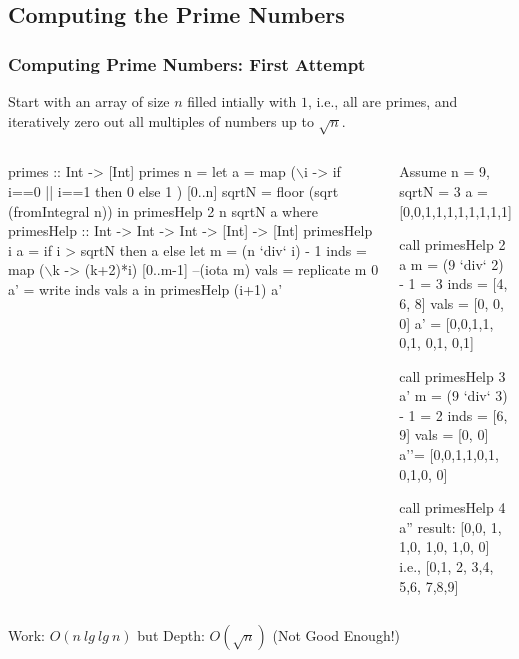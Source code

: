 \documentclass{beamer}
\renewcommand{\emph}[1]{\textcolor{structure}{#1}}
\newcommand{\emp}[1]{\textcolor{DikuRed}{ #1}}
\newcommand{\mymath}[1]{$ #1 $}
\begin{document}
\subsection{Computing the Prime Numbers}
\begin{frame}[fragile,t]
  \frametitle{Computing Prime Numbers: First Attempt}

Start with an array of size $n$ filled intially with $1$,
i.e., all are primes, and iteratively zero out all multiples
of numbers up to $\sqrt{n}$.

\begin{columns}
\begin{colorcode}[fontsize=\scriptsize]
primes :: Int -> [Int]
primes n = 
  let a = map (\mymath{\backslash}i -> if i==0 || i==1
                     then 0
                     else 1 ) [0..n]
      sqrtN = floor (sqrt (fromIntegral n))
  in  primesHelp 2 n sqrtN a
  where
    primesHelp :: Int -> Int -> Int 
               -> [Int] -> [Int]
    primesHelp i a = 
      if i > sqrtN then a
      else let m    = (n `div` i) - 1
               inds = \emph{map (\mymath{\backslash}k -> (k+2)*i)} 
                          \emph{[0..m-1]} --(iota m)
               vals = \emph{replicate m 0}
               a'   = \emph{write inds vals a}
           in  primesHelp (i+1) a'
\end{colorcode}
\begin{colorcode}[fontsize=\scriptsize]
Assume n = 9, sqrtN = 3 
a = [0,0,1,1,1,1,1,1,1,1]

call primesHelp 2 a
m    = (9 `div` 2) - 1 = 3
inds = [4, 6, 8]
vals = [0, 0, 0]
a' = [0,0,1,1,\emp{0},1,\emp{0},1,\emp{0},1]

call primesHelp 3 a'
m    = (9 `div` 3) - 1 = 2
inds = [6, 9]
vals = [0, 0]
a''= [0,0,1,1,0,1,\emp{0},1,0,\emp{0}]

call primesHelp 4 a''
result: [0,0,\emp{1},\emp{1},0,\emp{1},0,\emp{1},0,\emp{0}]
  i.e., [0,1,\emp{2},\emp{3},4,\emp{5},6,\emp{7},8,9]
\end{colorcode}
\end{columns}
\medskip

\emph{Work: $O(n \ lg \ lg \ n)$} but \emp{Depth: $O(\sqrt{n})$ (Not Good Enough!)}

\end{frame}
\end{document}

